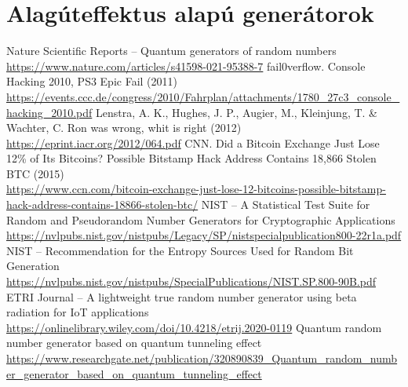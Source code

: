 \documentclass[12pt,a4paper,oneside]{article}
\begin{document}
\section*{Alagúteffektus alapú generátorok}
\begin{thebibliography}{12}
	\sloppy
	 Nature Scientific Reports -- Quantum generators of random numbers \\ \url{https://www.nature.com/articles/s41598-021-95388-7}
	 fail0verflow. Console Hacking 2010, PS3 Epic Fail (2011) \\ \url{https://events.ccc.de/congress/2010/Fahrplan/attachments/1780_27c3_console_hacking_2010.pdf}
	 Lenstra, A. K., Hughes, J. P., Augier, M., Kleinjung, T. \& Wachter, C. Ron was wrong, whit is right (2012) \\ \url{https://eprint.iacr.org/2012/064.pdf}
	 CNN. Did a Bitcoin Exchange Just Lose 12\% of Its Bitcoins? Possible Bitstamp Hack Address Contains 18,866 Stolen BTC (2015) \\ \url{https://www.ccn.com/bitcoin-exchange-just-lose-12-bitcoins-possible-bitstamp-hack-address-contains-18866-stolen-btc/}
	 NIST -- A Statistical Test Suite for Random and Pseudorandom Number Generators for Cryptographic Applications \\ \url{https://nvlpubs.nist.gov/nistpubs/Legacy/SP/nistspecialpublication800-22r1a.pdf}
	 NIST -- Recommendation for the Entropy Sources Used for Random Bit Generation \\ \url{https://nvlpubs.nist.gov/nistpubs/SpecialPublications/NIST.SP.800-90B.pdf}
	 ETRI Journal -- A lightweight true random number generator using beta radiation for IoT applications \\ \url{https://onlinelibrary.wiley.com/doi/10.4218/etrij.2020-0119}
	 Quantum random number generator based on quantum tunneling effect \\ \url{https://www.researchgate.net/publication/320890839_Quantum_random_number_generator_based_on_quantum_tunneling_effect}
\end{thebibliography}
\end{document}
